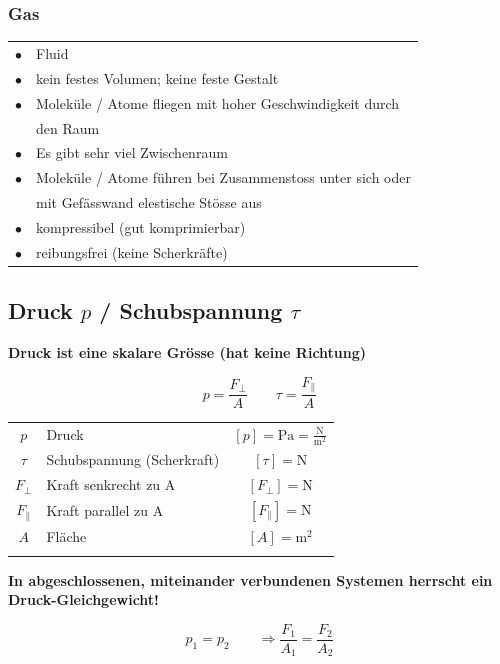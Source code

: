 \subsubsection{Gas}

\begin{tabular}{ll}
	$\bullet$ & Fluid \\
	$\bullet$ & kein festes Volumen; keine feste Gestalt \\
	$\bullet$ & Moleküle / Atome fliegen mit hoher Geschwindigkeit durch\\
			  & den Raum \\
	$\bullet$ & Es gibt sehr viel Zwischenraum \\
	$\bullet$ &  Moleküle / Atome führen bei Zusammenstoss unter sich oder\\
			  & mit Gefässwand elestische Stösse aus \\
	$\bullet$ & kompressibel (gut komprimierbar)  \\
	$\bullet$ & reibungsfrei (keine Scherkräfte)\\

\end{tabular}




\subsection{Druck $p$ / Schubspannung $\tau$}
\textbf{Druck ist eine skalare Grösse (hat keine Richtung)} 


$$\boxed{ p = \frac{F_{\perp}}{A} } \qquad \boxed{ \tau = \frac{F_{\parallel}}{A} } $$

	\begin{tabular}{c l c}
		$p$ & Druck & $[p] = \mathrm{Pa = \frac{N}{m^2}}$ \\
		$\tau$ & Schubspannung (Scherkraft) & $[\tau] = \mathrm{N} $ \\
		$F_{\perp}$ & Kraft senkrecht zu A & $[F_{\perp}] = \mathrm{N}$ \\
		$F_{\parallel}$ & Kraft parallel zu A & $[F_{\parallel}] = \mathrm{N}$ \\
		$A$ & Fläche & $[A] = \mathrm{m^2}$ \\
		\\
	\end{tabular}
	
	\textbf{In abgeschlossenen, miteinander verbundenen Systemen herrscht ein Druck-Gleichgewicht!} 
	
	$$ \boxed{ p_1 = p_2  \qquad \Rightarrow \frac{F_1}{A_1} = \frac{F_2}{A_2} }$$
	
